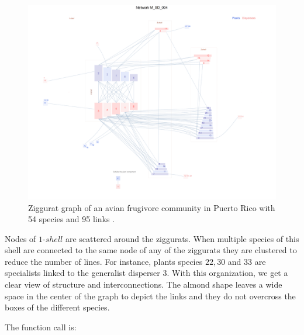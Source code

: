 \documentclass[12pt]{article}
\begin{document}
\begin{figure}[hp!]
\centering
\includegraphics[scale=0.4]{M_SD_004_ziggurat.png}
\caption {Ziggurat graph of an avian frugivore community in Puerto Rico with 54 species and 95 links \cite{carlo2003avian}.}
\label{fig:KMAN_ziggurat}
\end{figure}

Nodes of $1$-$shell$ are scattered around the ziggurats. When multiple species of this shell are connected to the same node of any of the ziggurats they are clustered to reduce the number of lines. For instance, plants species $22, 30$ and $33$ are specialists linked to the generalist disperser $3$. With this organization, we get a clear view of structure and interconnections. The almond shape leaves a wide space in the center of the graph to depict the links and they do not overcross the boxes of the different species.

\noindent The function call is:
\end{document}
